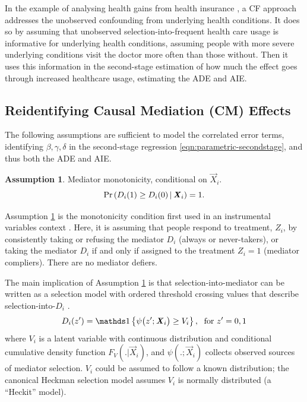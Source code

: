 In the example of analysing health gains from health insurance \citep{finkelstein2008oregon}, a CF approach addresses the unobserved confounding from underlying health conditions.
It does so by assuming that unobserved selection-into-frequent health care usage is informative for underlying health conditions, assuming people with more severe underlying conditions visit the doctor more often than those without.
Then it uses this information in the second-stage estimation of how much the effect goes through increased healthcare usage, estimating the ADE and AIE.

\subsection{Reidentifying Causal Mediation (CM) Effects}
The following assumptions are sufficient to model the correlated error terms, identifying $\beta, \gamma, \delta$ in the second-stage regression \eqref{eqn:parametric-secondstage}, and thus both the ADE and AIE.

\theoremstyle{definition}
\newtheorem{assumptionCF}{Assumption}
\renewcommand\theassumptionCF{CF--\arabic{assumptionCF}}
\begin{assumptionCF}
    \label{cf:monotonicity}
    Mediator monotonicity, conditional on $\vec X_i$.
    \[ \Pr\left(  D_i(1) \geq D_i(0)  \, \middle\vert \, \boldsymbol{\mathit{X}}_i \right) = 1. \]
\end{assumptionCF}
\noindent
Assumption \ref{cf:monotonicity} is the monotonicity condition first used in an instrumental variables context \citep{imbens1994identification}.
Here, it is assuming that people respond to treatment, $Z_i$, by consistently taking or refusing the mediator $D_i$ (always or never-takers), or taking the mediator $D_i$ if and only if assigned to the treatment $Z_i=1$ (mediator compliers).
There are no mediator defiers.

The main implication of Assumption \ref{cf:monotonicity} is that selection-into-mediator can be written as a selection model with ordered threshold crossing values that describe selection-into-$D_i$ \citep{vytlacil2002independence}.
\[ D_i(z') = \indicator{ \psi \big( z'; \vec X_i \big) \geq V_i},
    \;\text{ for } z'=0,1 \]
where $V_i$ is a latent variable with continuous distribution and conditional cumulative density function $F_V(.|\vec X_i)$, and $\psi(.;\vec X_i)$ collects observed sources of mediator selection.
$V_i$ could be assumed to follow a known distribution; the canonical Heckman selection model assumes $V_i$ is normally distributed (a ``Heckit'' model).


